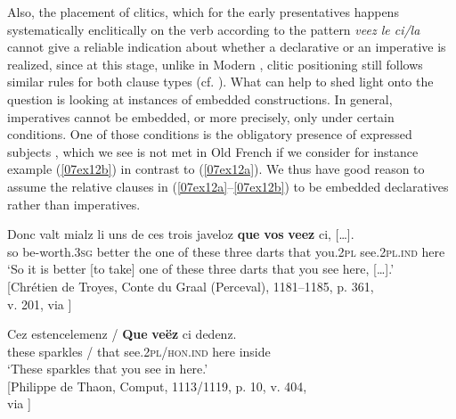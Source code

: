 \documentclass[output=paper,colorlinks,citecolor=brown]{langscibook}
\begin{document}

Also, the placement of clitics, which for the early presentatives happens systematically enclitically on the verb according to the pattern \emph{veez le ci/la} cannot give a reliable indication about whether a declarative or an imperative is realized, since at this stage, unlike in Modern , clitic positioning still follows similar rules for both clause types (cf. \citealt{hirschbuhlerlabelle2000}). What can help to shed light onto the question is looking at instances of embedded  constructions. In general, imperatives cannot be embedded, or more precisely, only under certain conditions. One of those conditions is the obligatory presence of expressed subjects \citep[196]{platzack2007}, which we see is not met in Old French if we consider for instance example (\ref{07ex12b}) in contrast to (\ref{07ex12a}). We thus have good reason to assume the relative clauses in (\ref{07ex12a}--\ref{07ex12b}) to be embedded declaratives rather than imperatives.

\begin{exe}
	\ex
	\begin{xlist}
		\ex \label{07ex12a} \gll Donc valt mialz li uns de ces trois javeloz \textbf{que} \textbf{vos} \textbf{veez} ci, […]. \\
		so be-worth.\textsc{3sg} better the one of these three darts that you.\textsc{2pl} see.\textsc{2pl.ind} here \\
		\trans ‘So it is better [to take] one of these three darts that you see here, […].’ \\
		\hfill [Chrétien de Troyes, Conte du Graal (Perceval), 1181--1185, p. 361, \\
		\hfill v. 201, via \cite{bfm2019}]
		
		\ex \label{07ex12b} \gll Cez estencelemenz / \textbf{Que} \textbf{veëz} ci dedenz. \\
		these sparkles / that see.\textsc{2pl/hon.ind} here inside \\
		\trans ‘These sparkles that you see in here.’ \\
		\hfill [Philippe de Thaon, Comput, 1113/1119, p. 10, v. 404, \\
		\hfill via \cite{bfm2022}]
	\end{xlist}
\end{exe}
\end{document}
